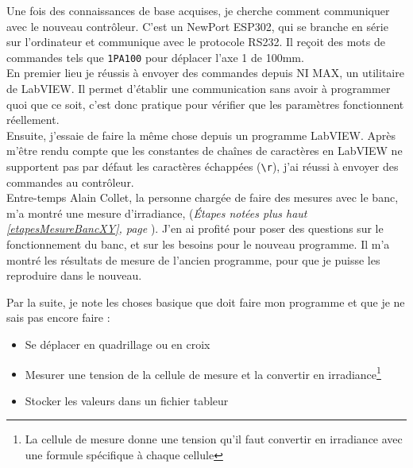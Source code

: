 \documentclass[12pt]{article}
\begin{document}
Une fois des connaissances de base acquises, je cherche comment communiquer avec le nouveau contrôleur.
C'est un NewPort ESP302, qui se branche en série sur l'ordinateur et communique avec le protocole RS232.
Il reçoit des mots de commandes tels que \verb|1PA100| pour déplacer l'axe 1 de 100mm.\\
En premier lieu je réussis à envoyer des commandes depuis NI MAX, un utilitaire de LabVIEW.
Il permet d'établir une communication sans avoir à programmer quoi que ce soit, c'est donc pratique pour vérifier que les paramètres fonctionnent réellement.\\
Ensuite, j'essaie de faire la même chose depuis un programme LabVIEW.
Après m'être rendu compte que les constantes de chaînes de caractères en LabVIEW ne supportent pas par défaut les caractères échappées (\texttt{\textbackslash r}), j'ai réussi à envoyer des commandes au contrôleur.\\
Entre-temps Alain Collet, la personne chargée de faire des mesures avec le banc, m'a montré une mesure d'irradiance, (\textit{Étapes notées plus haut \ref{etapesMesureBancXY}, page \pageref{etapesMesureBancXY}}).
J'en ai profité pour poser des questions sur le fonctionnement du banc, et sur les besoins pour le nouveau programme.
Il m'a montré les résultats de mesure de l'ancien programme, pour que je puisse les reproduire dans le nouveau.


Par la suite, je note les choses basique que doit faire mon programme et que je ne sais pas encore faire :
\begin{itemize}
	\item Se déplacer en quadrillage ou en croix
	\item Mesurer une tension de la cellule de mesure et la convertir en irradiance\footnote{La cellule de mesure donne une tension qu'il faut convertir en irradiance avec une formule spécifique à chaque cellule}
	\item Stocker les valeurs dans un fichier tableur
\end{itemize}
\end{document}
